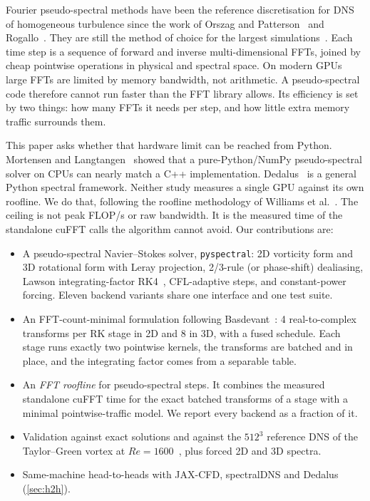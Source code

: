 \documentclass[11pt]{article}
\begin{document}
Fourier pseudo-spectral methods have been the reference discretisation for DNS of homogeneous
turbulence since the work of Orszag and Patterson~\cite{orszag1971aliasing,patterson1971spectral}
and Rogallo~\cite{rogallo1981numerical}. They are still the method of choice for the largest
simulations~\cite{yokokawa2002tflops,ishihara2009study,ravikumar2019gpu,yeung2025gpu}. Each time
step is a sequence of forward and inverse multi-dimensional FFTs, joined by cheap pointwise
operations in physical and spectral space. On modern GPUs large FFTs are limited by memory
bandwidth, not arithmetic. A pseudo-spectral code therefore cannot run faster than the FFT
library allows. Its efficiency is set by two things: how many FFTs it needs per step, and how
little extra memory traffic surrounds them.

This paper asks whether that hardware limit can be reached from Python. Mortensen and
Langtangen~\cite{mortensen2016high} showed that a pure-Python/NumPy pseudo-spectral solver on
CPUs can nearly match a C++ implementation. Dedalus~\cite{burns2020dedalus} is a general Python
spectral framework. Neither study measures a single GPU against its own roofline. We do that,
following the roofline methodology of Williams et al.~\cite{williams2009roofline}. The
ceiling is not peak FLOP/s or raw bandwidth. It is the measured time of the standalone cuFFT
calls the algorithm cannot avoid. Our contributions are:
\begin{itemize}
\item A pseudo-spectral Navier--Stokes solver, \texttt{pyspectral}: 2D vorticity form and 3D
  rotational form with Leray projection, 2/3-rule (or phase-shift) dealiasing, Lawson
  integrating-factor RK4~\cite{lawson1967generalized}, CFL-adaptive steps, and constant-power
  forcing. Eleven backend variants share one interface and one test suite.
\item An FFT-count-minimal formulation following Basdevant~\cite{basdevant1983technical}: 4
  real-to-complex transforms per RK stage in 2D and 8 in 3D, with a fused schedule. Each stage
  runs exactly two pointwise kernels, the transforms are batched and in place, and the integrating
  factor comes from a separable table.
\item An \emph{FFT roofline} for pseudo-spectral steps. It combines the measured standalone cuFFT
  time for the exact batched transforms of a stage with a minimal pointwise-traffic model. We
  report every backend as a fraction of it.
\item Validation against exact solutions and against the $512^3$ reference DNS of the
  Taylor--Green vortex at $Re=1600$~\cite{wang2013high,vanrees2011comparison}, plus forced 2D
  and 3D spectra.
\item Same-machine head-to-heads with JAX-CFD, spectralDNS and Dedalus (\cref{sec:h2h}).
\end{itemize}
\end{document}
